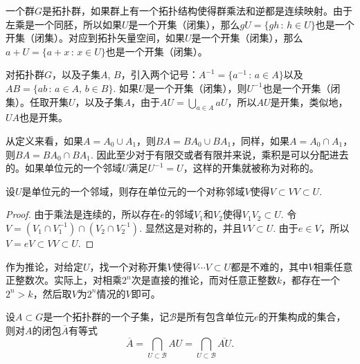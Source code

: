 一个群$G$是拓扑群，如果群上有一个拓扑结构使得群乘法和逆都是连续映射。由于左乘是一个同胚，所以如果$U$是一个开集（闭集），那么$gU=\{gh\,:\,h\in U\}$也是一个开集（闭集）。对应到拓扑矢量空间，如果$U$是一个开集（闭集），那么$a+U=\{a+x\,:\,x\in U\}$也是一个开集（闭集）。

对拓扑群$G$，以及子集$A$, $B$，引入两个记号：$A^{-1}=\{a^{-1}\,:\,a\in A\}$以及$AB=\{ab\,:\,a\in A,\, b\in B\}$. 如果$U$是一个开集（闭集），则$U^{-1}$也是一个开集（闭集）。任取开集$U$，以及子集$A$，由于$AU=\bigcup_{a\in A}aU$，所以$AU$是开集，类似地，$UA$也是开集。

从定义来看，如果$A=A_0\cup A_1$，则$BA=BA_0\cup BA_1$，同样，如果$A=A_0\cap A_1$，则$BA=BA_0\cap BA_1$. 因此至少对于有限交或者有限并来说，乘积是可以分配进去的。如果单位元的一个邻域$U$满足$U^{-1}=U$，这样的开集就被称为对称的。

\begin{lem}
设$U$是单位元的一个邻域，则存在单位元的一个对称邻域$V$使得$V\subset VV\subset U$. 
\end{lem}

\begin{proof}
	由于乘法是连续的，所以存在$e$的邻域$V_1$和$V_2$使得$V_1V_2\subset U$. 令$V=(V_1\cap V_1^{-1})\cap (V_2\cap V_2^{-1})$. 显然这是对称的，并且$VV\subset U$. 由于$e\in V$，所以$V=eV\subset VV\subset U$.
\end{proof}

作为推论，对给定$U$，找一个对称开集$V$使得$V\cdots V\subset U$都是不难的，其中$V$相乘任意正整数次。实际上，对相乘$2^n$次是直接的推论，而对任意正整数$k$，都存在一个$2^n>k$，然后取$V$为$2^n$情况的$V$即可。

\begin{lem}\label{lem:2}
设$A\subset G$是一个拓扑群的一个子集，记$\mathscr{B}$是所有包含单位元$e$的开集构成的集合，则对$A$的闭包$\overline{A}$有等式
\[
	\overline{A}=\bigcap_{U\subset \mathscr{B}}AU=\bigcap_{U\subset \mathscr{B}}\overline{AU}.
\]
\end{lem}

